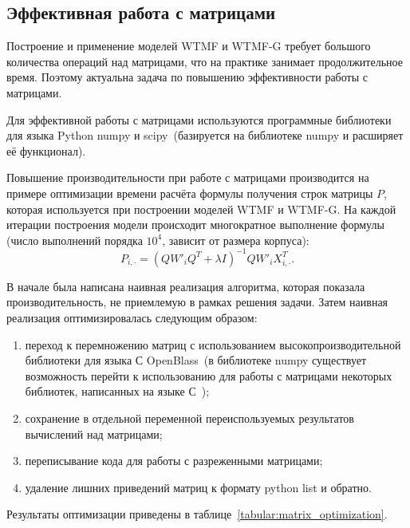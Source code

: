 
\subsection{Эффективная работа с матрицами}
    Построение и применение моделей WTMF и WTMF-G требует большого количества операций над матрицами, что на практике занимает продолжительное время.
    Поэтому актуальна задача по повышению эффективности работы с матрицами.

    Для эффективной работы с матрицами используются программные библиотеки для языка Python numpy и
    scipy~(базируется на библиотеке numpy и расширяет её функционал).

    Повышение производительности при работе с матрицами производится на примере оптимизации времени расчёта формулы получения строк матрицы $P$,
    которая используется при построении моделей WTMF и WTMF-G.
    На каждой итерации построения модели происходит многократное выполнение формулы (число выполнений порядка $10^4$, зависит от размера корпуса):
    $$P_{i, \cdot} = (Q W'_i Q^T + \lambda I)^{-1} Q W'_i X_{i,\cdot}^T.$$

    В начале была написана наивная реализация алгоритма, которая показала производительность, не приемлемую в рамках решения задачи.
    Затем наивная реализация оптимизировалась следующим образом:
    \begin{enumerate}
        \item переход к перемножению матриц с использованием высокопроизводительной библиотеки для языка С OpenBlass~(в библиотеке numpy существует возможность перейти к использованию для работы с матрицами некоторых библиотек, написанных на языке С~\cite{blas_installation});
        \item сохранение в отдельной переменной переиспользуемых результатов вычислений над матрицами;
        \item переписывание кода для работы с разреженными матрицами;
        \item удаление лишних приведений матриц к формату python list и обратно.
    \end{enumerate}
    Результаты оптимизации приведены в таблице~\ref{tabular:matrix_optimization}.

